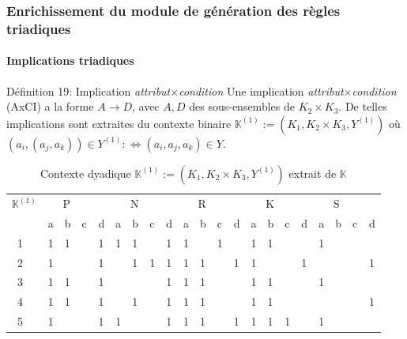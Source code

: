\documentclass[french]{beamer}
\def\KK{\mathbb{K}}
\begin{document}
\begin{frame}
\frametitle{Enrichissement du module de génération des règles triadiques}
\framesubtitle{Implications triadiques \parencite{Ganter2004}}
\begin{block}{Définition 19: Implication \emph{attribut}${\times}$\emph{condition}}
Une implication \emph{attribut}${\times}$\emph{condition} (AxCI) a la forme $A \rightarrow D$, avec $A, D$ des sous-ensembles de $K_2 {\times} K_3$.
De telles implications sont extraites du contexte binaire $\KK^{(1)}:= (K_1, K_2 {\times} K_3, Y^{(1)})$ où $(a_i, (a_j, a_k)) \in Y^{(1)} : \Leftrightarrow (a_i, a_j, a_k) \in
Y$.
\end{block}
\begin{table}[H]
\centering \small
\tiny
\begin{tabular}{|l|llll|llll|llll|llll|llll|}
\hline
 $\KK^{(1)}$  &\multicolumn{4}{l|}{ ~ ~P}&\multicolumn{4}{l|}{ ~ ~N}&\multicolumn{4}{l|}{ ~ ~R}&\multicolumn{4}{l|}{ ~ ~K}&\multicolumn{4}{l|}{ ~ ~S}\\
\cline{2-21}
      & a & b & c & d & a & b & c & d & a & b & c & d & a & b & c & d & a & b & c & d   \\
      \hline
      ~1 ~ &  1 &  1  &  ~  &  1  &  1  & 1  &  ~  &  1  &  1 &  ~  &  1  &  ~  &  1  &  1  &  ~  &  ~  & 1  &  ~  &  ~ &  ~ \\
      ~2~ &  1  &  ~  &  ~  &  1  &  ~  &  1  &  1  &  1  &  1 &  1  &  ~  &  1  & 1  &  ~  &  ~  &  1  &  ~  &  ~  &  ~ &  1\\
      ~3~ &  1  &  1  &  ~  &  1  &  ~  &  ~  &  ~  &  1  &  1 &  1  &  ~  &  ~  &  1  &  1  &  ~  &  ~  &  1  &  ~  &  ~ &  ~ \\
      ~4 ~&  1  &  1  &  ~  &  1  &  ~  &  1  &  ~  &  1  &  1  &  1  &  ~  &  ~  &  1  &  1  &  ~  &  ~  &  ~  &  ~ &  ~ & 1\\
      ~5~ &  1  &  ~  &  ~  &  1  &  1  &  ~  &  ~  &  1  &  1  &  1  &  ~  &  1  &  1  &  1  &  1  &  ~  &  1  &  ~ &  ~ &  ~\\

      \hline
\end{tabular}
\caption{Contexte dyadique $\KK^{(1)}:= (K_1, K_2 \times K_3, Y^{(1)})$ 
extrait de $\KK$}
\label{Tab:K1}
\end{table}
\end{frame}
\end{document}
